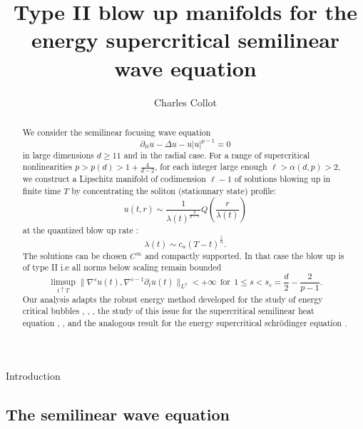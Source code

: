 \documentclass[11pt,a4paper,reqno]{amsart}
\title[]{Type II blow up manifolds for the energy supercritical semilinear wave equation}
\author[C.Collot]{Charles Collot}
\theoremstyle{remark}
\numberwithin{equation}{section}
\begin{document}
\maketitle

\begin{abstract}
We consider the semilinear focusing wave equation 
$${\partial}_{tt}u-\Delta u-u|u|^{p-1}=0$$
in large dimensions $d\geq 11$ and in the radial case. For a range of supercritical nonlinearities $p>p(d)>1+\frac{4}{d-2}$, for each integer large enough $\ell>\alpha (d,p)>2$, we construct a Lipschitz manifold of codimension $\ell -1$ of solutions blowing up in finite time $T$ by concentrating the soliton (stationnary state) profile:
$$u(t,r)\sim \frac{1}{{\lambda}(t)^{\frac 2{p-1}}}Q\left(\frac{r}{{\lambda}(t)}\right)$$
at the quantized  blow up rate : 
$${\lambda}(t)\sim c_u(T-t)^{\frac \ell\alpha}.$$
The solutions can be chosen $C^{\infty}$ and compactly supported. In that case the blow up is of type II i.e all norms below scaling remain bounded 
$$\limsup_{t\uparrow T}\|\nabla^su(t),\nabla^{s-1}\partial_tu(t)\|_{L^2}<+\infty\ \ \mbox{for}\ \ 1\leq s<s_c=\frac{d}{2}-\frac{2}{p-1}.$$
Our analysis adapts the robust energy method developed for the study of energy critical bubbles \cite{MRRod1}, \cite{RaphRod}, \cite{RSc1,RSc2}, the study of this issue for the supercritical semilinear heat equation \cite{Velas}, \cite{MaM2}, \cite{Mizo1,Mizo2} and the analogous result for the energy supercritical schr\"odinger equation \cite{MRRod2}. 
\end{abstract}

{  \z@{1.5\linespacing\@plus\linespacing}{.5\linespacing}  {\normalfont\bfseries\large\centering}}{Introduction}

\subsection{The semilinear wave equation}
\end{document}
